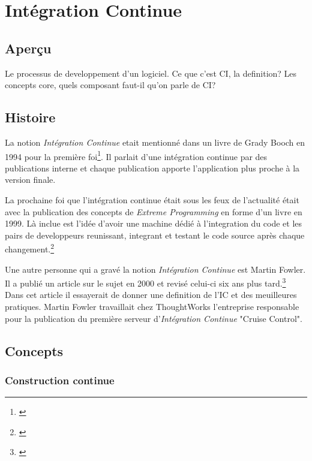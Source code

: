 \chapter{Intégration Continue}
\label{chap:integrationcontinue}


\section{Aperçu}

Le processus de developpement d'un logiciel.
Ce que c'est CI, la definition?
Les concepts core, quels composant faut-il qu'on parle de CI?

\section{Histoire}
La notion \textit{Intégration Continue} etait mentionné dans un livre de Grady Booch en 1994 pour la première foi\footnote{\cite{boochooad}}. Il parlait d'une intégration continue par des publications interne et chaque publication apporte l'application plus proche à la version finale.

La prochaine foi que l'intégration continue était sous les feux de l'actualité était avec la publication des concepts de \textit{Extreme Programming} en forme d'un livre en 1999.
Là inclue est l'idée d'avoir une machine dédié à l'integration du code et les pairs de developpeurs reunissant, integrant et testant le code source après chaque changement.\footnote{\cite{robertshistory}}

Une autre personne qui a gravé la notion \textit{Intégration Continue} est Martin Fowler. Il a publié un article sur le sujet en 2000 et revisé celui-ci six ans plus tard.\footnote{\cite{fowlerci}} Dans cet article il essayerait de donner une definition de l'IC et des meuilleures pratiques. Martin Fowler travaillait chez ThoughtWorks l'entreprise responsable pour la publication du première serveur d'\textit{Intégration Continue} "Cruise Control".

\nocite{wikici}

\section{Concepts}

\subsection{Construction continue}

